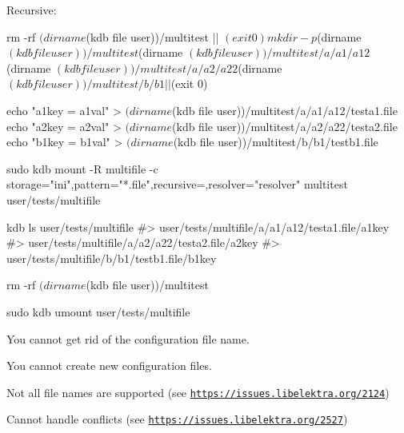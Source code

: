 Recursive\+:


\begin{DoxyCode}
rm -rf $(dirname $(kdb file user))/multitest || $(exit 0)
mkdir -p $(dirname $(kdb file user))/multitest $(dirname $(kdb file user))/multitest/a/a1/a12 $(dirname
       $(kdb file user))/multitest/a/a2/a22 $(dirname $(kdb file user))/multitest/b/b1|| $(exit 0)

echo "a1key = a1val" > $(dirname $(kdb file user))/multitest/a/a1/a12/testa1.file
echo "a2key = a2val" > $(dirname $(kdb file user))/multitest/a/a2/a22/testa2.file
echo "b1key = b1val" > $(dirname $(kdb file user))/multitest/b/b1/testb1.file

sudo kdb mount -R multifile -c storage="ini",pattern="*.file",recursive=,resolver="resolver" multitest
       user/tests/multifile

kdb ls user/tests/multifile
#> user/tests/multifile/a/a1/a12/testa1.file/a1key
#> user/tests/multifile/a/a2/a22/testa2.file/a2key
#> user/tests/multifile/b/b1/testb1.file/b1key

rm -rf $(dirname $(kdb file user))/multitest

sudo kdb umount user/tests/multifile
\end{DoxyCode}



\begin{DoxyItemize}
\item You cannot get rid of the configuration file name.
\item You cannot create new configuration files.
\item Not all file names are supported (see \href{https://issues.libelektra.org/2124}{\tt https\+://issues.\+libelektra.\+org/2124})
\item Cannot handle conflicts (see \href{https://issues.libelektra.org/2527}{\tt https\+://issues.\+libelektra.\+org/2527}) 
\end{DoxyItemize}